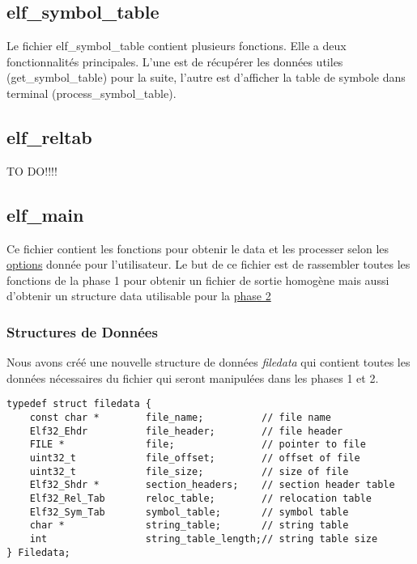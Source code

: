 \documentclass[a4paper]{article} %
\begin{document}

\subsection{elf\_symbol\_table}
\label{sec:symbol}

Le fichier elf\_symbol\_table contient plusieurs fonctions. Elle a deux 
fonctionnalités principales. L'une est de récupérer les données utiles 
(get\_symbol\_table) pour la suite, l'autre est d'afficher la table de symbole 
dans terminal (process\_symbol\_table).



\subsection{elf\_reltab}
\label{sec:relocation}

TO DO!!!!


\subsection{elf\_main}
Ce fichier contient les fonctions pour obtenir le data et les processer selon les 
\hyperref[sec:options]{options} donnée pour l'utilisateur. Le but de ce fichier est 
de rassembler toutes les fonctions de la phase 1 pour obtenir un fichier de sortie 
homogène mais aussi d'obtenir un structure data utilisable pour la 
\hyperref[sec:phase2]{phase 2} 

\subsubsection*{Structures de Données}
\label{sec:filedata}

Nous avons créé une nouvelle structure de données \textit{filedata} qui contient 
toutes les données nécessaires du fichier qui seront manipulées dans les phases 
1 et 2. 

\begin{lstlisting}
typedef struct filedata {
    const char *        file_name;          // file name
    Elf32_Ehdr          file_header;        // file header
    FILE *              file;               // pointer to file
    uint32_t            file_offset;        // offset of file
    uint32_t            file_size;          // size of file
    Elf32_Shdr *        section_headers;    // section header table
    Elf32_Rel_Tab       reloc_table;        // relocation table
    Elf32_Sym_Tab       symbol_table;       // symbol table
    char *              string_table;       // string table
    int                 string_table_length;// string table size
} Filedata;
\end{lstlisting}
\end{document}
